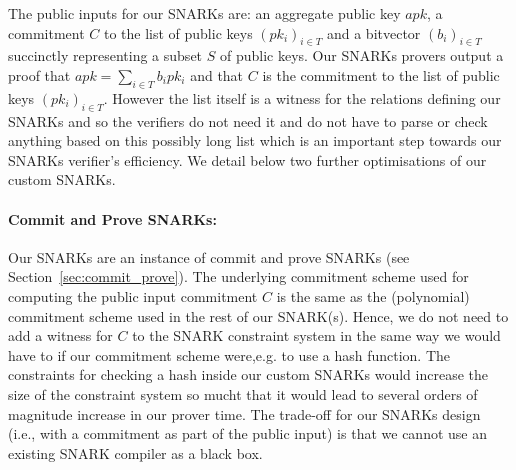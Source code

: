 \vspace{-0.05cm}
\noindent The public inputs for our SNARKs are: an aggregate public key $\mathit{apk}$, a commitment $C$ to the list of 
public keys $(pk_i)_{i \in T}$ and a bitvector $(b_i)_{i \in T}$ succinctly representing a subset $S$ of public keys. 
Our SNARKs provers output a proof that $apk=\sum_{i \in T} b_i pk_i$ and that $C$ is the commitment to the list of public keys 
$(pk_i)_{i \in T}$. However the list itself is a witness for the relations defining our SNARKs and so the verifiers do not need it 
and do not have to parse or check anything based on this possibly long list which is an important step towards our SNARKs verifier's efficiency.
We detail below two further optimisations of our custom SNARKs.

\vspace{-0.05in}
\paragraph{Commit and Prove SNARKs:} Our SNARKs are an instance of commit and prove SNARKs (see Section~\ref{sec:commit_prove}). 
The underlying commitment scheme used for computing the public input commitment $C$ is the same as the (polynomial) commitment scheme used in the rest of our SNARK(s). Hence, we do not need to add a witness for $C$ 
to the SNARK constraint system in the same way we would have to if our commitment scheme were,e.g. to use a hash function.
The constraints for checking a hash inside our custom SNARKs would increase the size of the constraint system so mucht that it would lead to several orders of magnitude increase in our prover time. 
The trade-off for our SNARKs design (i.e., with a commitment as part of the public input) is that we cannot use an existing SNARK compiler as a black box.

